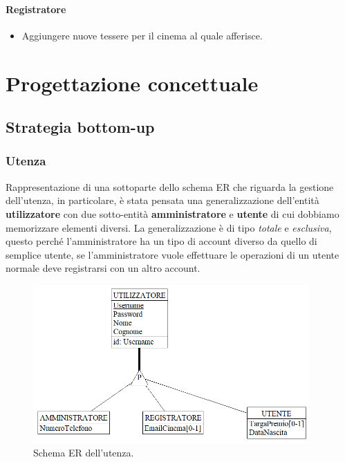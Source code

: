\documentclass[a4paper,12pt]{report}
\begin{document}
\subsubsection{Registratore}
\begin{itemize}
	\item Aggiungere nuove tessere per il cinema al quale afferisce.
\end{itemize}
\chapter{Progettazione concettuale}
\section{Strategia bottom-up}
\subsection{Utenza}
Rappresentazione di una sottoparte dello schema ER che riguarda la gestione dell'utenza, in particolare, è stata pensata una generalizzazione dell'entità \textbf{utilizzatore} con due sotto-entità \textbf{amministratore} e \textbf{utente} di cui dobbiamo memorizzare elementi diversi. La generalizzazione è di tipo \textit{totale} e \textit{esclusiva}, questo perché l'amministratore ha un tipo di account diverso da quello di semplice utente, se l'amministratore vuole effettuare le operazioni di un utente normale deve registrarsi con un altro account.
\begin{figure}[H]
	\centering
	\includegraphics[width=300pt]{ER/utenza.png}
	\caption{Schema ER dell'utenza.}
\end{figure}
\end{document}
